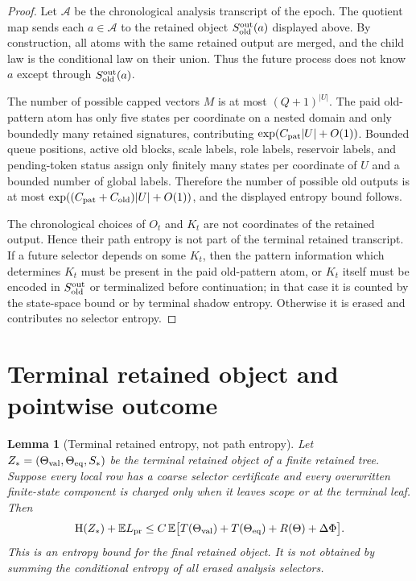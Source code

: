 \documentclass[11pt]{article}
\newtheorem{lemma}[theorem]{Lemma}
\theoremstyle{remark}
\newcommand{\E}{\mathbb E}
\newcommand{\HH}{\mathrm H}
\newcommand{\pr}{\mathrm{pr}}
\newcommand{\old}{\mathrm{old}}
\begin{document}
\begin{proof}
Let $\mathcal A$ be the chronological analysis transcript of the epoch.  The quotient map sends each $a\in\mathcal A$ to the retained object $S_{\old}^{\rm out}(a)$ displayed above.  By construction, all atoms with the same retained output are merged, and the child law is the conditional law on their union.  Thus the future process does not know $a$ except through $S_{\old}^{\rm out}(a)$.

The number of possible capped vectors $M$ is at most $(Q+1)^{|U|}$.  The paid old-pattern atom has only five states per coordinate on a nested domain and only boundedly many retained signatures, contributing $\exp(C_{\rm pat}|U|+O(1))$.  Bounded queue positions, active old blocks, scale labels, role labels, reservoir labels, and pending-token status assign only finitely many states per coordinate of $U$ and a bounded number of global labels.  Therefore the number of possible old outputs is at most $\exp((C_{\rm pat}+C_{\old})|U|+O(1))$, and the displayed entropy bound follows.

The chronological choices of $O_t$ and $K_t$ are not coordinates of the retained output.  Hence their path entropy is not part of the terminal retained transcript.  If a future selector depends on some $K_t$, then the pattern information which determines $K_t$ must be present in the paid old-pattern atom, or $K_t$ itself must be encoded in $S_{\old}^{\rm out}$ or terminalized before continuation; in that case it is counted by the state-space bound or by terminal shadow entropy.  Otherwise it is erased and contributes no selector entropy.
\end{proof}

\section{Terminal retained object and pointwise outcome}

\begin{lemma}[Terminal retained entropy, not path entropy]\label{lem:terminal-retained-not-path}
Let $Z_*=(\Theta_{\rm val},\Theta_{\rm eq},S_*)$ be the terminal retained object of a finite retained tree.  Suppose every local row has a coarse selector certificate and every overwritten finite-state component is charged only when it leaves scope or at the terminal leaf.  Then
\[
        \HH(Z_*)+\E L_{\pr}
        \le C\,\E\bigl[T(\Theta_{\rm val})+T(\Theta_{\rm eq})+R(\Theta)+\Delta\Phi\bigr].
\]
This is an entropy bound for the final retained object.  It is not obtained by summing the conditional entropy of all erased analysis selectors.
\end{lemma}
\end{document}
